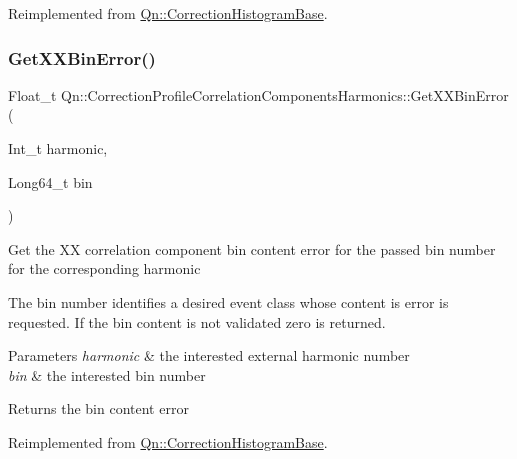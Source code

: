 Reimplemented from \mbox{\hyperlink{classQn_1_1CorrectionHistogramBase_ac28c760f664f1b52fb6bef3f85f7ce94}{Qn\+::\+Correction\+Histogram\+Base}}.

\mbox{\label{classQn_1_1CorrectionProfileCorrelationComponentsHarmonics_a412fe35fd2adf2a73a6ddfdad4a3f880}} 
\subsubsection{\texorpdfstring{Get\+X\+X\+Bin\+Error()}{GetXXBinError()}}
{\footnotesize\ttfamily Float\+\_\+t Qn\+::\+Correction\+Profile\+Correlation\+Components\+Harmonics\+::\+Get\+X\+X\+Bin\+Error (\begin{DoxyParamCaption}\item[{Int\+\_\+t}]{harmonic,  }\item[{Long64\+\_\+t}]{bin }\end{DoxyParamCaption})\hspace{0.3cm}{\ttfamily [virtual]}}

Get the XX correlation component bin content error for the passed bin number for the corresponding harmonic

The bin number identifies a desired event class whose content is error is requested. If the bin content is not validated zero is returned.


\begin{DoxyParams}{Parameters}
{\em harmonic} & the interested external harmonic number \\
\hline
{\em bin} & the interested bin number \\
\hline
\end{DoxyParams}
\begin{DoxyReturn}{Returns}
the bin content error 
\end{DoxyReturn}


Reimplemented from \mbox{\hyperlink{classQn_1_1CorrectionHistogramBase_a6c0874928f737e86a7f72cba9a9922b7}{Qn\+::\+Correction\+Histogram\+Base}}.

\mbox{\label{classQn_1_1CorrectionProfileCorrelationComponentsHarmonics_af7d5feb2bafb19417950f6d16cdfceb0}} 
